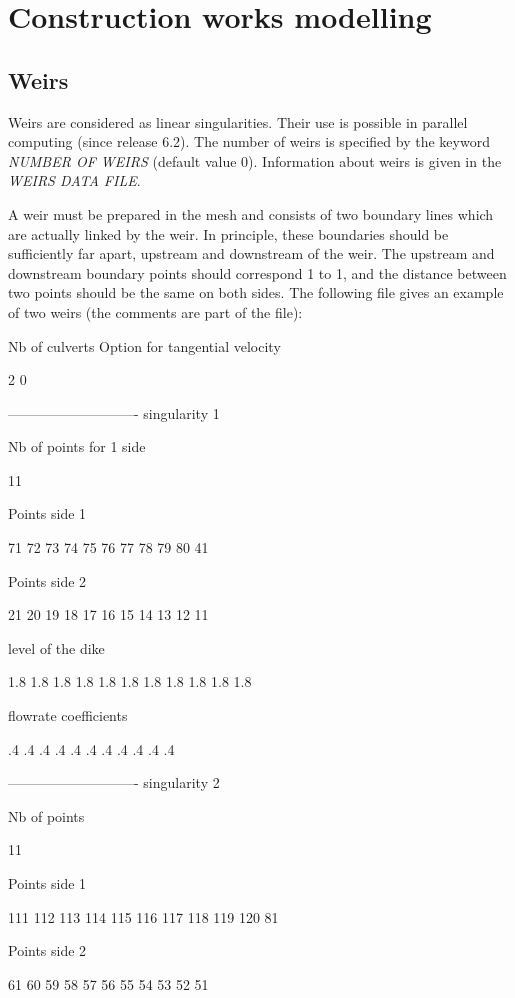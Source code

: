 
\chapter{  Construction works modelling}


\section{ Weirs}

 Weirs are considered as linear singularities. Their use is possible in parallel computing (since release 6.2). The number of weirs is specified by the keyword \textit{NUMBER OF WEIRS} (default value 0). Information about weirs is given in the \textit{WEIRS DATA FILE}.

 A weir must be prepared in the mesh and consists of two boundary lines which are actually linked by the weir. In principle, these boundaries should be sufficiently far apart, upstream and downstream of the weir. The upstream and 
downstream boundary points should correspond 1 to 1, and the distance between two points should be the same on both sides. The following file gives an example of two weirs (the comments are part of the file):

 Nb of culverts  Option for tangential velocity

       2                    0

 ---------------------------- singularity 1

 Nb of points for 1 side

 11

 Points side 1

 71 72 73 74 75 76 77 78 79 80 41

 Points side 2

 21 20 19 18 17 16 15 14 13 12 11

 level of the dike

 1.8 1.8 1.8 1.8 1.8 1.8 1.8 1.8 1.8 1.8 1.8

 flowrate coefficients

  .4  .4  .4  .4  .4  .4  .4  .4  .4  .4  .4

 ---------------------------- singularity 2

 Nb of points

 11

 Points side 1

 111 112 113 114 115 116 117 118 119 120 81

 Points side 2

 61 60 59 58 57 56 55 54 53 52 51

